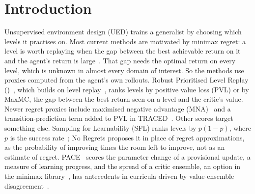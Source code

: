\section{Introduction}
\label{sec:intro}

Unsupervised environment design (UED) trains a generalist by choosing which levels it
practises on. Most current methods are motivated by minimax regret: a level is worth
replaying when the gap between the best achievable return on it and the agent's return is
large~\citep{jiang2021robustplr,dennis2020paired}. That gap needs the optimal return on
every level, which is unknown in almost every domain of interest. So the methods use
proxies computed from the agent's own rollouts. Robust Prioritised Level Replay
(\PLRp{})~\citep{jiang2021robustplr}, which builds on level replay~\citep{jiang2021plr},
ranks levels by positive value loss (PVL) or by MaxMC, the gap between the best return
seen on a level and the critic's value. Newer regret proxies include maximised negative
advantage (MNA)~\citep{mead2026mna} and a transition-prediction term added to PVL in
TRACED~\citep{cho2026traced}. Other scores target something else. Sampling for
Learnability (SFL) ranks levels by $p(1-p)$, where $p$ is the success
rate~\citep{rutherford2024noregrets}; No Regrets proposes it in place of regret
approximations, as the probability of improving times the room left to improve, not as
an estimate of regret.
PACE~\citep{yuan2026pace} scores the parameter change of a provisional update, a measure
of learning progress, and the spread of a critic ensemble, an option in the minimax
library~\citep{minimax2023code}, has antecedents in curricula driven by value-ensemble
disagreement~\citep{zhang2020vds,kanitscheider2022autodime}.


